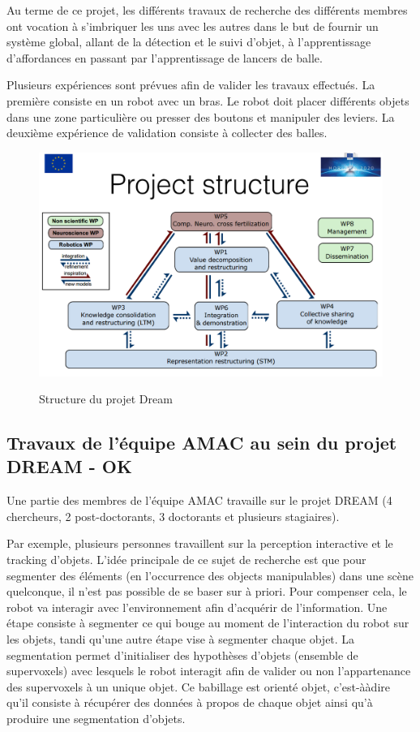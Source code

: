 \documentclass[draft]{llncs}
\begin{document}
Au terme de ce projet, les différents travaux de recherche des différents membres ont vocation à s'imbriquer les uns avec les autres dans le but de fournir un système global, allant de la détection et le suivi d'objet, à l'apprentissage d'affordances en passant par l'apprentissage de lancers de balle.


Plusieurs expériences sont prévues afin de valider les travaux effectués.
La première consiste en un robot avec un bras.
Le robot doit placer différents objets dans une zone particulière ou presser des boutons et manipuler des leviers. La deuxième expérience de validation consiste à collecter des balles.

\begin{figure}
	\centering
	\includegraphics[width=.7\textwidth]{figures/project_structure.png}
	\label{fig:dream}
	\caption{Structure du projet Dream}
\end{figure}

\subsection{Travaux de l'équipe AMAC au sein du projet DREAM - OK}

Une partie des membres de l'équipe AMAC travaille sur le projet DREAM (4 chercheurs, 2 post-doctorants, 3 doctorants et plusieurs stagiaires).

Par exemple, plusieurs personnes travaillent sur la perception interactive et le tracking d'objets.
L'idée principale de ce sujet de recherche est que pour segmenter des éléments (en l'occurrence des objects manipulables) dans une scène quelconque, il n'est pas possible de se baser sur à priori.
Pour compenser cela, le robot va interagir avec l'environnement afin d'acquérir de l'information.
Une étape consiste à segmenter ce qui bouge au moment de l'interaction du robot sur les objets, tandi qu'une autre étape vise à segmenter chaque objet.
La segmentation permet d'initialiser des hypothèses d'objets (ensemble de supervoxels) avec lesquels le robot interagit afin de valider ou non l'appartenance des supervoxels à un unique objet.
Ce babillage est orienté objet, c'est-ààdire qu'il consiste à récupérer des données à propos de chaque objet ainsi qu'à produire une segmentation d'objets.
\end{document}
